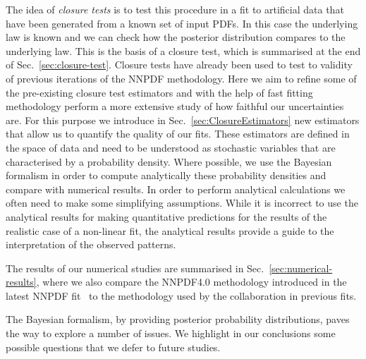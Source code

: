 The idea of {\em closure tests} is to test this procedure in a fit to artificial
data that have been generated from a known set of input PDFs. In this case the
underlying law is known and we can check how the posterior distribution compares
to the underlying law. This is the basis of a closure test, which is summarised
at the end of Sec.~\ref{sec:closure-test}. Closure tests have already been used
to test to validity
of previous iterations of the NNPDF methodology. Here we aim to refine some of
the pre-existing closure test estimators and with the help of fast fitting
methodology perform a more extensive study of how faithful our uncertainties
are. For this purpose we introduce in Sec.~\ref{sec:ClosureEstimators} new
estimators that allow us to
quantify the quality of our fits. These estimators are defined in the space of
data and need to be understood as stochastic variables that are characterised by
a probability density. Where possible, we use the Bayesian formalism in order to
compute analytically these probability densities and compare with numerical
results. In order to perform analytical calculations we often need to make some
simplifying assumptions. While it is incorrect to use the analytical results for
making quantitative predictions for the results of the realistic case of a
non-linear fit, the analytical results provide a guide to the interpretation of
the observed patterns. 

The results of our numerical studies are summarised in
Sec.~\ref{sec:numerical-results}, where we also
compare the NNPDF4.0 methodology introduced in the latest NNPDF
fit~\cite{NNPDF40} to the methodology used by the collaboration in previous
fits. 
 
The Bayesian formalism, by providing posterior probability distributions, paves
the way to explore a number of issues. We highlight in our conclusions some
possible questions that we defer to future studies. 

